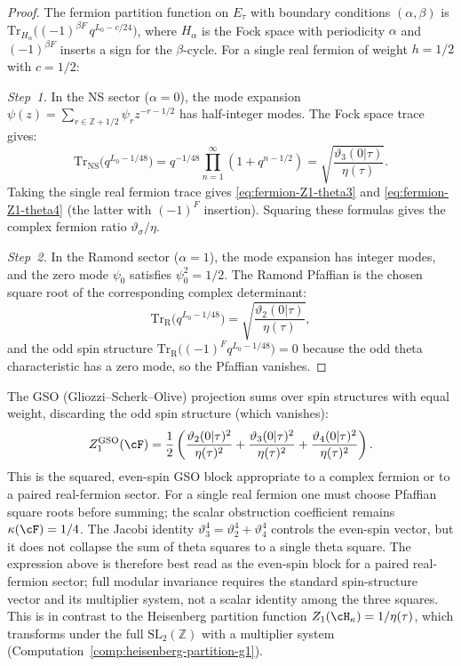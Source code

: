\begin{proof}
The fermion partition function on $E_\tau$ with boundary
conditions $(\alpha, \beta)$ is
$\mathrm{Tr}_{H_{\alpha}}\bigl((-1)^{\beta F}\, q^{L_0 - c/24}\bigr)$,
where $H_\alpha$ is the Fock space with periodicity $\alpha$
and $(-1)^{\beta F}$ inserts a sign for the $\beta$-cycle.
For a single real fermion of weight $h = 1/2$ with
$c = 1/2$:

\emph{Step~1.} In the NS sector ($\alpha = 0$), the mode
expansion $\psi(z) = \sum_{r \in \mathbb{Z} + 1/2}
\psi_r z^{-r-1/2}$ has half-integer modes. The Fock space
trace gives:
\[
\mathrm{Tr}_{\mathrm{NS}}\bigl(q^{L_0 - 1/48}\bigr)
= q^{-1/48} \prod_{n=1}^\infty (1 + q^{n-1/2})
= \sqrt{\frac{\vartheta_3(0|\tau)}{\eta(\tau)}}.
\]
Taking the single real fermion trace gives
\eqref{eq:fermion-Z1-theta3} and
\eqref{eq:fermion-Z1-theta4} (the latter with
$(-1)^F$ insertion). Squaring these formulas gives the complex
fermion ratio $\vartheta_\sigma/\eta$.

\emph{Step~2.} In the Ramond sector ($\alpha = 1$), the mode
expansion has integer modes, and the zero mode $\psi_0$
satisfies $\psi_0^2 = 1/2$. The Ramond Pfaffian is the
chosen square root of the corresponding complex determinant:
\[
\mathrm{Tr}_{\mathrm{R}}\bigl(q^{L_0 - 1/48}\bigr)
= \sqrt{\frac{\vartheta_2(0|\tau)}{\eta(\tau)}},
\]
and the odd spin structure
$\mathrm{Tr}_{\mathrm{R}}\bigl((-1)^F q^{L_0 - 1/48}\bigr) = 0$
because the odd theta characteristic has a zero mode, so the
Pfaffian vanishes.
\end{proof}

\begin{computation}
\label{comp:fermion-gso}
The GSO (Gliozzi--Scherk--Olive) projection sums over spin
structures with equal weight, discarding the odd spin
structure (which vanishes):
\begin{equation}\label{eq:fermion-gso}
Z_1^{\mathrm{GSO}}(\cF)
= \frac{1}{2}\left(
 \frac{\vartheta_2(0|\tau)^2}{\eta(\tau)^2}
+ \frac{\vartheta_3(0|\tau)^2}{\eta(\tau)^2}
+ \frac{\vartheta_4(0|\tau)^2}{\eta(\tau)^2}
\right).
\end{equation}
This is the squared, even-spin GSO block appropriate to a complex
fermion or to a paired real-fermion sector. For a single real fermion
one must choose Pfaffian square roots before summing; the scalar
obstruction coefficient remains $\kappa(\cF)=1/4$.
The Jacobi identity
$\vartheta_3^4 = \vartheta_2^4 + \vartheta_4^4$
controls the even-spin vector, but it does not collapse the sum of
theta squares to a single theta square. The expression above is
therefore best read as the even-spin block for a paired
real-fermion sector; full modular invariance requires the standard
spin-structure vector and its multiplier system, not a scalar
identity among the three squares. This is in contrast to the Heisenberg
partition function $Z_1(\cH_\kappa) = 1/\eta(\tau)$,
which transforms under the full $\mathrm{SL}_2(\mathbb{Z})$
with a multiplier system
\textup{(}Computation~\textup{\ref{comp:heisenberg-partition-g1})}.
\end{computation}

